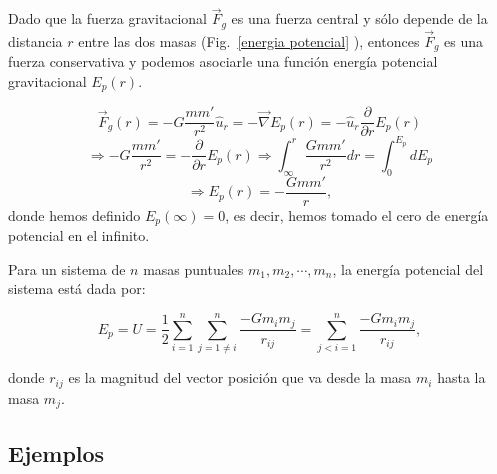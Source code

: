 Dado que la fuerza gravitacional $\vec{F}_g$ es una fuerza central y sólo depende de la distancia $r$ entre las dos masas (Fig.~\ref{energia potencial} ), entonces $\vec{F}_g$ es una fuerza conservativa y podemos asociarle una función energía potencial gravitacional $E_p(r)$.

\begin{equation*}
\vec{F}_g(r)= -G\dfrac{mm'}{r^2}\hat{u}_r = -\vec{\nabla}E_p(r) = - \hat{u}_r \dfrac{\partial}{\partial r} E_p(r) 
\end{equation*}
\begin{equation*}
\Rightarrow -G \dfrac{mm'}{r^2}=- \dfrac{\partial}{\partial r} E_p(r) \Rightarrow \int _{\infty} ^{r} \dfrac{Gmm'}{r^2}dr = \int_{0}^{E_p} dE_p
\end{equation*}
\begin{equation}
\Rightarrow \boxed{E_p(r)= -\dfrac{Gmm'}{r}} ,
\label{energiag}
\end{equation}
donde hemos definido $E_p(\infty)=0$, es decir, hemos tomado el cero de energía potencial en el infinito.

Para un sistema de $n$ masas puntuales $m_1, m_2, \cdots, m_n$, la energía potencial del sistema está dada por:

\begin{equation}
E_p=U =\dfrac{1}{2}\sum_{i=1}^n\sum_{j=1\neq i}^n \dfrac{-Gm_im_j}{r_{ij}} = \sum_{j<i=1}^{n} \dfrac{-Gm_im_j}{r_{ij}} ,
\end{equation}

donde $r_{ij}$ es la magnitud del vector posición que va desde la masa $m_i$ hasta la masa $m_j$.\\

\subsection*{Ejemplos}

